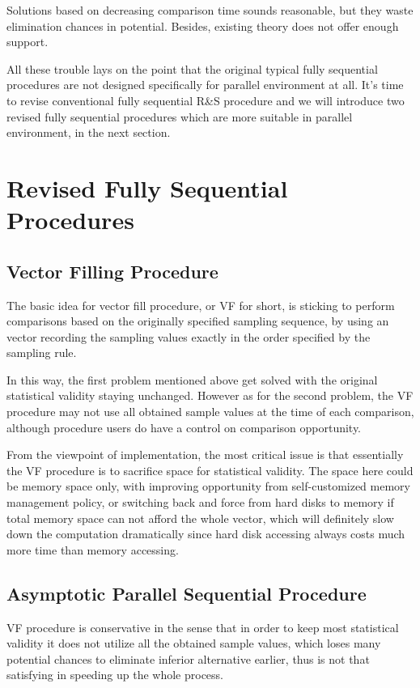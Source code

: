 \documentclass[12pt,a4]{report}
\begin{document}
Solutions based on decreasing comparison time sounds reasonable, but they waste elimination chances in potential. Besides, existing theory does not offer enough support.

All these trouble lays on the point that the original typical fully sequential procedures are not designed specifically for parallel environment at all. It's time to revise conventional fully sequential R\&S procedure and we will introduce two revised fully sequential procedures which are more suitable in parallel environment, in the next section.

\section{Revised Fully Sequential Procedures}

\subsection{Vector Filling Procedure}

The basic idea for vector fill procedure, or VF for short, is sticking to perform comparisons based on the originally specified sampling sequence, by using an vector recording the sampling values exactly in the order specified by the sampling rule.

In this way, the first problem mentioned above get solved with the original statistical validity staying unchanged. However as for the second problem, the VF procedure may not use all obtained sample values at the time of each comparison, although procedure users do have a control on comparison opportunity.

From the viewpoint of implementation, the most critical issue is that essentially the VF procedure is to sacrifice space for statistical validity. The space here could be memory space only, with improving opportunity from self-customized memory management policy, or switching back and force from hard disks to memory if total memory space can not afford the whole vector, which will definitely slow down the computation dramatically since hard disk accessing always costs much more time than memory accessing.

\subsection{Asymptotic Parallel Sequential Procedure}

VF procedure is conservative in the sense that in order to keep most statistical validity it does not utilize all the obtained sample values, which loses many potential chances to eliminate inferior alternative earlier, thus is not that satisfying in speeding up the whole process.
\end{document}
